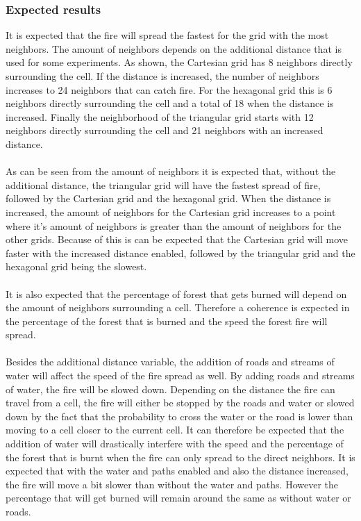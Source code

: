 \documentclass{article}
\begin{document}
\begin{multicols}{2}
\subsubsection*{Expected results}
It is expected that the fire will spread the fastest for the grid with the most neighbors. The amount of neighbors depends on the additional distance that is used for some experiments. As shown, the Cartesian grid has 8 neighbors directly surrounding the cell. If the distance is increased, the number of neighbors increases to 24 neighbors that can catch fire. For the hexagonal grid this is 6 neighbors directly surrounding the cell and a total of 18 when the distance is increased. Finally the neighborhood of the triangular grid starts with 12 neighbors directly surrounding the cell and 21 neighbors with an increased distance.\\\\
As can be seen from the amount of neighbors it is expected that, without the additional distance, the triangular grid will have the fastest spread of fire, followed by the Cartesian grid and the hexagonal grid. When the distance is increased, the amount of neighbors for the Cartesian grid increases to a point where it's amount of neighbors is greater than the amount of neighbors for the other grids. Because of this is can be expected that the Cartesian grid will move faster with the increased distance enabled, followed by the triangular grid and the hexagonal grid being the slowest.\\\\
It is also expected that the percentage of forest that gets burned will depend on the amount of neighbors surrounding a cell. Therefore a coherence is expected in the percentage of the forest that is burned and the speed the forest fire will spread.\\\\
Besides the additional distance variable, the addition of roads and streams of water will affect the speed of the fire spread as well. By adding roads and streams of water, the fire will be slowed down. Depending on the distance the fire can travel from a cell, the fire will either be stopped by the roads and water or slowed down by the fact that the probability to cross the water or the road is lower than moving to a cell closer to the current cell. It can therefore be expected that the addition of water will drastically interfere with the speed and the percentage of the forest that is burnt when the fire can only spread to the direct neighbors. It is expected that with the water and paths enabled and also the distance increased, the fire will move a bit slower than without the water and paths. However the percentage that will get burned will remain around the same as without water or roads.\\

\end{multicols}
\end{document}
